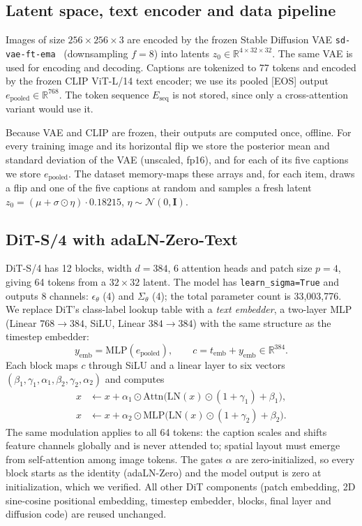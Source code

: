 \documentclass{article}
\newcommand{\epooled}{e_{\mathrm{pooled}}}
\newcommand{\temb}{t_{\mathrm{emb}}}
\newcommand{\yemb}{y_{\mathrm{emb}}}
\begin{document}
\subsection{Latent space, text encoder and data pipeline}

Images of size $256\times256\times3$ are encoded by the frozen Stable Diffusion VAE \texttt{sd-vae-ft-ema}~\cite{stability_sdvae} (downsampling $f=8$) into latents $z_0\in\mathbb{R}^{4\times32\times32}$.
The same VAE is used for encoding and decoding.
Captions are tokenized to 77 tokens and encoded by the frozen CLIP ViT-L/14 text encoder; we use its pooled [EOS] output $\epooled\in\mathbb{R}^{768}$.
The token sequence $E_{\mathrm{seq}}$ is not stored, since only a cross-attention variant would use it.

Because VAE and CLIP are frozen, their outputs are computed once, offline.
For every training image and its horizontal flip we store the posterior mean and standard deviation of the VAE (unscaled, fp16), and for each of its five captions we store $\epooled$.
The dataset memory-maps these arrays and, for each item, draws a flip and one of the five captions at random and samples a fresh latent $z_0=(\mu+\sigma\odot\eta)\cdot0.18215$, $\eta\sim\mathcal{N}(0,\mathbf{I})$.

\subsection{DiT-S/4 with adaLN-Zero-Text}

DiT-S/4 has 12 blocks, width $d=384$, 6 attention heads and patch size $p=4$, giving 64 tokens from a $32\times32$ latent.
The model has \texttt{learn\_sigma=True} and outputs 8 channels: $\epsilon_\theta$ (4) and $\Sigma_\theta$ (4); the total parameter count is 33,003,776.
We replace DiT's class-label lookup table with a \emph{text embedder}, a two-layer MLP (Linear $768\to384$, SiLU, Linear $384\to384$) with the same structure as the timestep embedder:
\begin{equation}
  \yemb=\mathrm{MLP}(\epooled),\qquad c=\temb+\yemb\in\mathbb{R}^{384}.
\end{equation}
Each block maps $c$ through SiLU and a linear layer to six vectors $(\beta_1,\gamma_1,\alpha_1,\beta_2,\gamma_2,\alpha_2)$ and computes
\begin{align}
  x &\leftarrow x+\alpha_1\odot\mathrm{Attn}\big(\mathrm{LN}(x)\odot(1+\gamma_1)+\beta_1\big),\\
  x &\leftarrow x+\alpha_2\odot\mathrm{MLP}\big(\mathrm{LN}(x)\odot(1+\gamma_2)+\beta_2\big).
\end{align}
The same modulation applies to all 64 tokens: the caption scales and shifts feature channels globally and is never attended to; spatial layout must emerge from self-attention among image tokens.
The gates $\alpha$ are zero-initialized, so every block starts as the identity (adaLN-Zero) and the model output is zero at initialization, which we verified.
All other DiT components (patch embedding, 2D sine-cosine positional embedding, timestep embedder, blocks, final layer and diffusion code) are reused unchanged.
\end{document}
